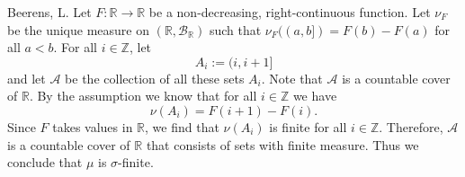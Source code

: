   \begin{solution}[3.21]{Beerens, L.}
    Let $F:\mathbb{R}\rightarrow\mathbb{R}$ be a non-decreasing, right-continuous function. Let $\nu_F$ be the unique measure on $(\mathbb{R},\mathcal{B}_\mathbb{R})$ such that $\nu_F((a,b])=F(b)-F(a)$ for all $a<b$. For all $i\in\mathbb{Z}$, let
    $$
        A_i:= (i,i+1]
    $$
    and let $\mathcal{A}$ be the collection of all these sets $A_i$. Note that $\mathcal{A}$ is a countable cover of $\mathbb{R}$. By the assumption we know that for all $i\in\mathbb{Z}$ we have
    $$
        \nu(A_i)  = F(i+1) - F(i).
    $$
    Since $F$ takes values in $\mathbb{R}$, we find that $\nu(A_i)$ is finite for all $i\in\mathbb{Z}$. Therefore, $\mathcal{A}$ is a countable cover of $\mathbb{R}$ that consists of sets with finite measure. Thus we conclude that $\mu$ is $\sigma$-finite.
\end{solution}
